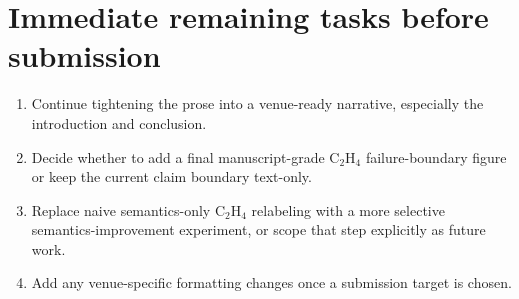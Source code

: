 \documentclass[11pt]{article}
\begin{document}
\section*{Immediate remaining tasks before submission}
\begin{enumerate}[leftmargin=1.5em]
  \item Continue tightening the prose into a venue-ready narrative, especially the introduction and conclusion.
  \item Decide whether to add a final manuscript-grade C$_2$H$_4$ failure-boundary figure or keep the current claim boundary text-only.
  \item Replace naive semantics-only C$_2$H$_4$ relabeling with a more selective semantics-improvement experiment, or scope that step explicitly as future work.
  \item Add any venue-specific formatting changes once a submission target is chosen.
\end{enumerate}



\end{document}
